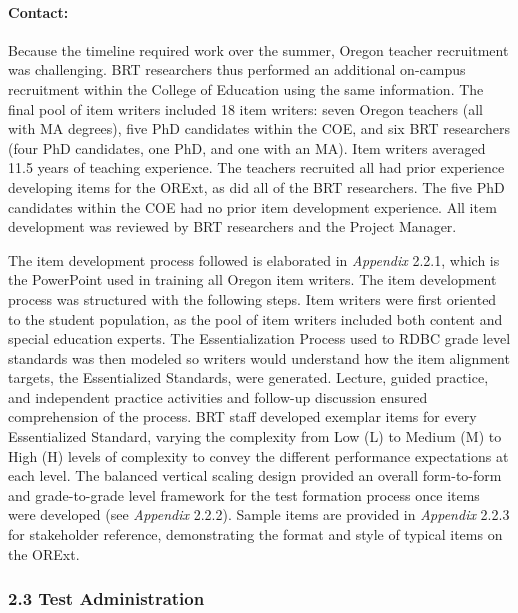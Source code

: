 \documentclass[]{article}
\let\oldparagraph\paragraph
\renewcommand{\paragraph}[1]{\oldparagraph{#1}\mbox{}}
\begin{document}
\hypertarget{contact}{%
\paragraph{Contact:}\label{contact}}

Because the timeline required work over the summer, Oregon teacher
recruitment was challenging. BRT researchers thus performed an
additional on-campus recruitment within the College of Education using
the same information. The final pool of item writers included 18 item
writers: seven Oregon teachers (all with MA degrees), five PhD
candidates within the COE, and six BRT researchers (four PhD candidates,
one PhD, and one with an MA). Item writers averaged 11.5 years of
teaching experience. The teachers recruited all had prior experience
developing items for the ORExt, as did all of the BRT researchers. The
five PhD candidates within the COE had no prior item development
experience. All item development was reviewed by BRT researchers and the
Project Manager.

The item development process followed is elaborated in \emph{Appendix}
2.2.1, which is the PowerPoint used in training all Oregon item writers.
The item development process was structured with the following steps.
Item writers were first oriented to the student population, as the pool
of item writers included both content and special education experts. The
Essentialization Process used to RDBC grade level standards was then
modeled so writers would understand how the item alignment targets, the
Essentialized Standards, were generated. Lecture, guided practice, and
independent practice activities and follow-up discussion ensured
comprehension of the process. BRT staff developed exemplar items for
every Essentialized Standard, varying the complexity from Low (L) to
Medium (M) to High (H) levels of complexity to convey the different
performance expectations at each level. The balanced vertical scaling
design provided an overall form-to-form and grade-to-grade level
framework for the test formation process once items were developed (see
\emph{Appendix} 2.2.2). Sample items are provided in \emph{Appendix}
2.2.3 for stakeholder reference, demonstrating the format and style of
typical items on the ORExt.

\hypertarget{test-administration}{%
\subsubsection{2.3 Test Administration}\label{test-administration}}
\end{document}
